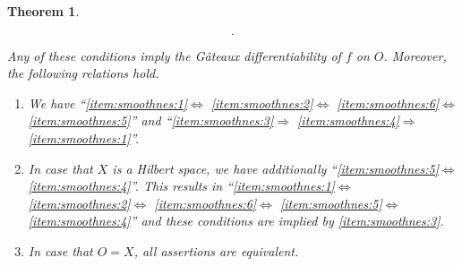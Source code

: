 \documentclass[
	english
]{scrartcl}
\numberwithin{equation}{section} %
\newtheorem{theorem}{Theorem}[section]
\begin{document}
\begin{theorem}
\begin{enumerate}
\begin{equation*}
				.
			\end{equation*}
	\end{enumerate}
	Any of these conditions imply the Gâteaux differentiability of $f$ on $O$.
	Moreover, the following relations hold.
	\begin{enumerate}[label=\textup{(\alph*)}]
		\item
			\label{item:relations_1}
			We have
			``\ref{item:smoothnes:1}$\Leftrightarrow$%
			\ref{item:smoothnes:2}$\Leftrightarrow$%
			\ref{item:smoothnes:6}$\Leftrightarrow$%
			\ref{item:smoothnes:5}''
			and
			``\ref{item:smoothnes:3}$\Rightarrow$%
			\ref{item:smoothnes:4}$\Rightarrow$%
			\ref{item:smoothnes:1}''.

		\item
			\label{item:relations_2}
			In case that $X$ is a Hilbert space,
			we have additionally
			``\ref{item:smoothnes:5}$\Leftrightarrow$\ref{item:smoothnes:4}''.
			This results in
			``\ref{item:smoothnes:1}$\Leftrightarrow$%
			\ref{item:smoothnes:2}$\Leftrightarrow$%
			\ref{item:smoothnes:6}$\Leftrightarrow$%
			\ref{item:smoothnes:5}$\Leftrightarrow$%
			\ref{item:smoothnes:4}''
			and these conditions are implied by
			\ref{item:smoothnes:3}.
		\item
			\label{item:relations_3}
			In case that $O = X$, all assertions are equivalent.
	\end{enumerate}
\end{theorem}
\end{document}
